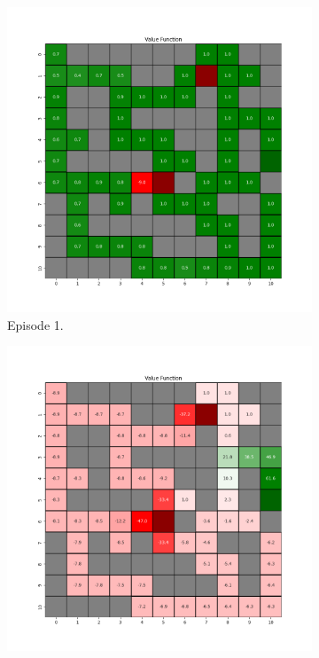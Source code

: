 \documentclass{assignment}
\begin{document}

\begin{figure}[H]
    \begin{subfigure}{0.3\textwidth}
        \includegraphics[width=\textwidth]{figures/value_td/default/value_function_alpha_0.1_gamma_0.95_epsilon_0.2_iteration_1.png}
    \caption{Episode 1.}
    \end{subfigure}\hfill
    \begin{subfigure}{0.3\textwidth}
        \includegraphics[width=\textwidth]{figures/value_td/default/value_function_alpha_0.1_gamma_0.95_epsilon_0.2_iteration_50.png}

\end{subfigure}
\end{figure}
\end{document}

